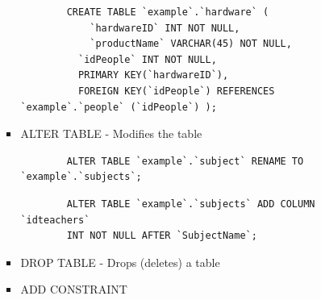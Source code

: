 \documentclass[12pt, a4, twoside]{article}
\begin{document}
\begin{itemize}
\begin{itemize}
\begin{itemize}
      \begin{verbatim}
        CREATE TABLE `example`.`hardware` (
	        `hardwareID` INT NOT NULL,
	        `productName` VARCHAR(45) NOT NULL,
          `idPeople` INT NOT NULL,
          PRIMARY KEY(`hardwareID`),
          FOREIGN KEY(`idPeople`) REFERENCES `example`.`people` (`idPeople`) );
      \end{verbatim}
      \item ALTER TABLE - Modifies the table 
      \begin{verbatim}
        ALTER TABLE `example`.`subject` RENAME TO  `example`.`subjects`;
      \end{verbatim}
      \begin{verbatim}
        ALTER TABLE `example`.`subjects` ADD COLUMN `idteachers` 
        INT NOT NULL AFTER `SubjectName`;
      \end{verbatim}
      \item DROP TABLE - Drops (deletes) a table
      \item ADD CONSTRAINT 
      \begin{verbatim}
        
      \end{verbatim}
    \end{itemize}
  \end{itemize}




\end{itemize}
\end{document}
